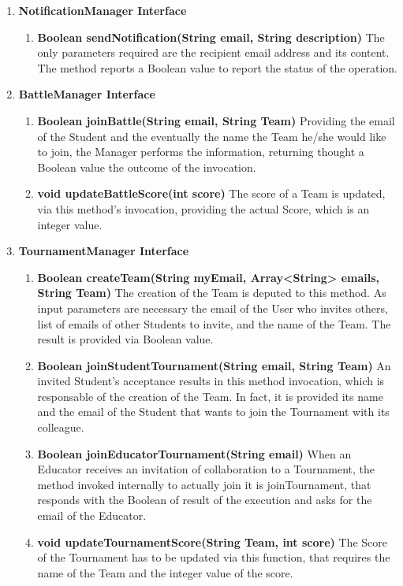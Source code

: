 \begin{enumerate}
    \item \textbf{NotificationManager Interface}
        \begin{enumerate}[label=$\bullet$]
            \item \textbf{Boolean sendNotification(String email, String description)} The only parameters required are the recipient email address and its content. The method reports a Boolean value to report the status of the operation.
        \end{enumerate}
    \item \textbf{BattleManager Interface}
        \begin{enumerate}[label=$\bullet$]
            \item \textbf{Boolean joinBattle(String email, String Team)} Providing the email of the Student and the eventually the name the Team he/she would like to join, the Manager performs the information, returning thought a Boolean value the outcome of the invocation.
            \item \textbf{void updateBattleScore(int score)} The score of a Team is updated, via this method's invocation, providing the actual Score, which is an integer value.
        \end{enumerate}
    \item \textbf{TournamentManager Interface}
        \begin{enumerate}[label=$\bullet$]
        \item \textbf{Boolean createTeam(String myEmail, Array<String> emails, String Team)} The creation of the Team is deputed to this method. As input parameters are necessary the email of the User who invites others, list of emails of other Students to invite, and the name of the Team. The result is provided via Boolean value. 
        \item \textbf{Boolean joinStudentTournament(String email, String Team)} An invited Student's acceptance results in this method invocation, which is responsable of the creation of the Team. In fact, it is provided its name and the email of the Student that wants to join the Tournament with its colleague.
        \item \textbf{Boolean joinEducatorTournament(String email)} When an Educator receives an invitation of collaboration to a Tournament, the method invoked internally to actually join it is joinTournament, that responds with the Boolean of result of the execution and asks for the email of the Educator.
        \item \textbf{void updateTournamentScore(String Team, int score)} The Score of the Tournament has to be updated via this function, that requires the name of the Team and the integer value of the score.

\end{enumerate}
\end{enumerate}
